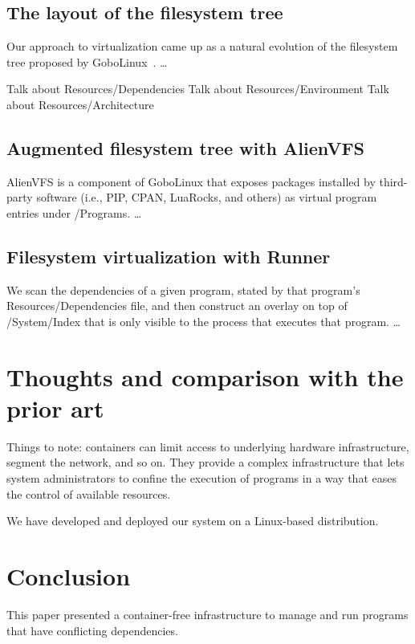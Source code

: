 \documentclass[sigplan, anonymous]{acmart}
\begin{document}
\subsection{The layout of the filesystem tree}
Our approach to virtualization came up as a natural evolution of the filesystem tree proposed
by GoboLinux~\cite{GoboLinux}. \ldots

Talk about Resources/Dependencies
Talk about Resources/Environment
Talk about Resources/Architecture

\subsection{Augmented filesystem tree with AlienVFS}
AlienVFS is a component of GoboLinux that exposes packages installed by third-party software
(i.e., PIP, CPAN, LuaRocks, and others) as virtual program entries under /Programs. \ldots

\subsection{Filesystem virtualization with Runner}
We scan the dependencies of a given program, stated by that program's Resources/Dependencies
file, and then construct an overlay on top of /System/Index that is only visible to the process
that executes that program. \ldots


\section{Thoughts and comparison with the prior art}
Things to note: containers can limit access to underlying hardware infrastructure, segment the
network, and so on. They provide a complex infrastructure that lets system administrators to
confine the execution of programs in a way that eases the control of available resources.

We have developed and deployed our system on a Linux-based distribution.

\section{Conclusion}
This paper presented a container-free infrastructure to manage and run programs that have
conflicting dependencies. 



\end{document}
